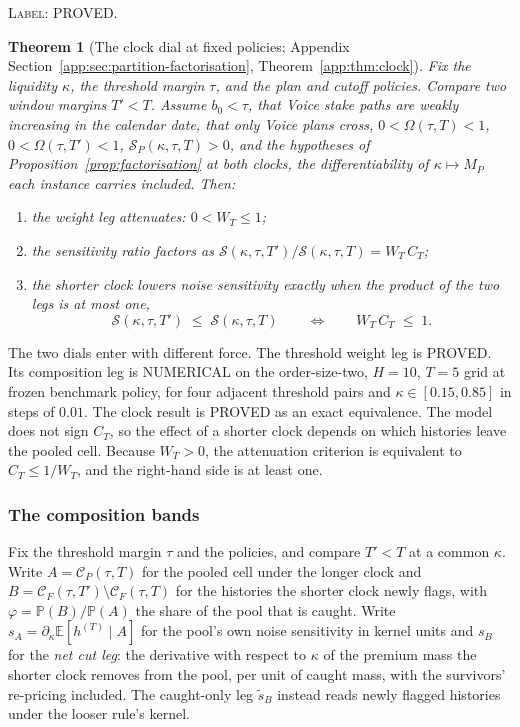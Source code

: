 \documentclass[11pt]{article}
\newtheorem{theorem}{Theorem}
\newcommand{\Eop}{\mathbb{E}}
\newcommand{\Prb}{\mathbb{P}}
\begin{document}
\noindent\textsc{Label: PROVED.}\par
\begin{theorem}[The clock dial at fixed policies; Appendix Section~\ref{app:sec:partition-factorisation}, Theorem~\ref{app:thm:clock}]
\label{thm:clock}
Fix the liquidity $\kappa$, the threshold margin $\tau$, and the plan and cutoff policies.
Compare two window margins $T' < T$. Assume $b_0 < \tau$, that Voice stake paths are weakly
increasing in the calendar date, that only Voice plans cross, $0 < \Omega(\tau,T) < 1$,
$0 < \Omega(\tau,T') < 1$, $\mathcal S_P(\kappa,\tau,T) > 0$, and the hypotheses of
Proposition~\ref{prop:factorisation} at both clocks, the differentiability of
$\kappa \mapsto M_P$ each instance carries included. Then:
\begin{enumerate}[label=(\roman*),leftmargin=2.4em,itemsep=2pt]
\item the weight leg attenuates: $0 < W_T \le 1$;
\item the sensitivity ratio factors as $\mathcal S(\kappa,\tau,T')/\mathcal S(\kappa,\tau,T)
  = W_T\,C_T$;
\item the shorter clock lowers noise sensitivity exactly when the product of the two legs is
  at most one,
  \[
  \mathcal S(\kappa,\tau,T') \;\le\; \mathcal S(\kappa,\tau,T)
  \qquad\Longleftrightarrow\qquad
  W_T\,C_T \;\le\; 1 .
  \]
\end{enumerate}
\end{theorem}

The two dials enter with different force. The threshold weight leg is PROVED. Its composition leg is
NUMERICAL on the order-size-two, $H=10$, $T=5$ grid at frozen benchmark policy, for four adjacent
threshold pairs and $\kappa\in[0.15,0.85]$ in steps of $0.01$. The clock result is PROVED as an
exact equivalence. The model does not sign $C_T$, so the effect of a shorter clock depends on which
histories leave the pooled cell. Because $W_T>0$, the attenuation criterion is equivalent to
$C_T\leq1/W_T$, and the right-hand side is at least one.

\subsubsection*{The composition bands}
\label{sec:caught}

Fix the threshold margin $\tau$ and the policies, and compare $T' < T$ at a common $\kappa$.
Write $A = \mathcal C_P(\tau,T)$ for the pooled cell under the longer clock and
$B = \mathcal C_F(\tau,T')\setminus\mathcal C_F(\tau,T)$ for the histories the shorter clock
newly flags, with $\varphi = \Prb(B)/\Prb(A)$ the share of the pool that is caught. Write
$s_A = \partial_\kappa\Eop[h^{(T)} \mid A]$ for the pool's own noise sensitivity in kernel
units and $s_B$ for the \emph{net cut leg}: the derivative with respect to $\kappa$ of the
premium mass the shorter clock removes from the pool, per unit of caught mass, with the
survivors' re-pricing included. The caught-only leg $\widetilde s_B$ instead reads newly flagged
histories under the looser rule's kernel.
\end{document}
